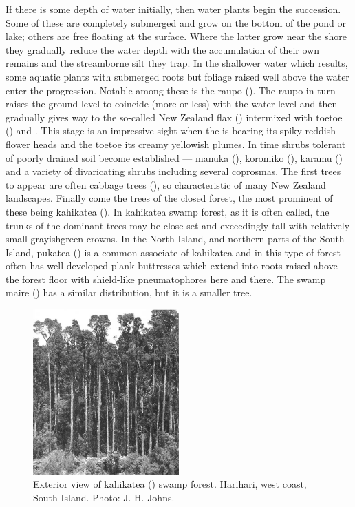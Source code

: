If there is some depth of water initially, then water plants begin the succession.
Some of these are completely submerged and grow on the bottom of the pond or lake; others are free floating at the surface.
Where the latter grow near the shore they gradually reduce the water depth with the accumulation of their own remains and the streamborne silt they trap.
In the shallower water which results, some aquatic plants with submerged roots but foliage raised well above the water enter the progression.
Notable among these is the raupo ().
The raupo in turn raises the ground level to coincide (more or less) with the water level and then gradually gives way to the so-called New Zealand flax () intermixed with toetoe () and .
This stage is an impressive sight when the  is bearing its spiky reddish flower heads and the toetoe its creamy yellowish plumes.
In time shrubs tolerant of poorly drained soil become established — manuka (), koromiko (), karamu () and a variety of divaricating shrubs including several coprosmas.
The first trees to appear are often cabbage trees (), so characteristic of many New Zealand landscapes.
Finally come the trees of the closed forest, the most prominent of these being kahikatea ().
In kahikatea swamp forest, as it is often called, the trunks of the dominant trees may be close-set and exceedingly tall with relatively small grayishgreen crowns.
In the North Island, and northern parts of the South Island, pukatea () is a common associate of kahikatea and in this type of forest often has well-developed plank buttresses which extend into roots raised above the forest floor with shield-like pneumatophores here and there.
The swamp maire () has a similar distribution, but it is a smaller tree.

\begin{figure}
	\includegraphics[width=0.5\textwidth]{graphics/figure67kahikatea.jpg}
	\centering
	\caption[Exterior view of kahikatea swamp forest]{Exterior view of kahikatea () swamp forest.
	Harihari, west coast, South Island.
	Photo: J. H. Johns.}
	\label{fig:67kahikatea}
\end{figure}

